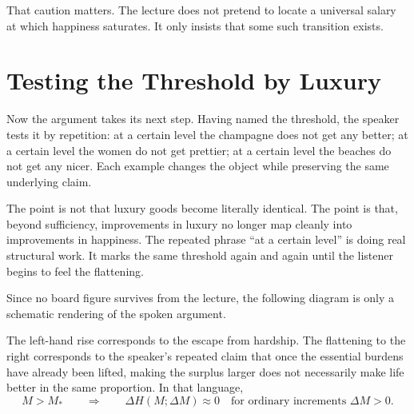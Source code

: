 That caution matters. The lecture does not pretend to locate a universal salary at which happiness saturates. It only insists that some such transition exists.

\section{Testing the Threshold by Luxury}

Now the argument takes its next step. Having named the threshold, the speaker tests it by repetition: at a certain level the champagne does not get any better; at a certain level the women do not get prettier; at a certain level the beaches do not get any nicer. Each example changes the object while preserving the same underlying claim.

The point is not that luxury goods become literally identical. The point is that, beyond sufficiency, improvements in luxury no longer map cleanly into improvements in happiness. The repeated phrase ``at a certain level'' is doing real structural work. It marks the same threshold again and again until the listener begins to feel the flattening.

Since no board figure survives from the lecture, the following diagram is only a schematic rendering of the spoken argument.

\begin{figure}
\centering
{}
\end{figure}

The left-hand rise corresponds to the escape from hardship. The flattening to the right corresponds to the speaker’s repeated claim that once the essential burdens have already been lifted, making the surplus larger does not necessarily make life better in the same proportion. In that language,
\begin{equation}
M>M_*
\qquad \Longrightarrow \qquad
\Delta H(M;\Delta M)\approx 0
\quad
\text{for ordinary increments } \Delta M>0.
\end{equation}

